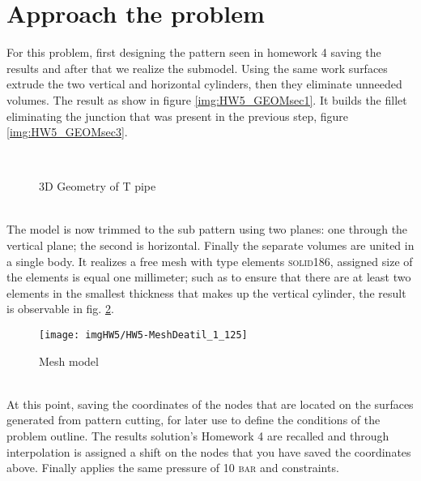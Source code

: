 \section{Approach the problem}
For this problem, first designing the pattern seen in homework 4 saving the results and after that we realize the submodel.
Using the same work surfaces extrude the two vertical and horizontal cylinders, then they eliminate unneeded volumes. The result as show in figure \ref{img:HW5_GEOMsec1}.
It builds the fillet eliminating the junction that was present in the previous step, figure \ref{img:HW5_GEOMsec3}.
\begin{figure}[!h]
\centering
{}\,
\caption{3D Geometry of T pipe}
\label{img:HW5-GeomSection}
\end{figure}\\
The model is now trimmed to the sub pattern using two planes: one through the vertical plane; the second is horizontal. Finally the separate volumes are united in a single body.
It realizes a free mesh with type elements \textsc{solid186}, assigned size of the elements is equal one millimeter; such as to ensure that there are at least two elements in the smallest thickness that makes up the vertical cylinder, the result is observable in fig. \ref{img:HW5_Mesh}.
\begin{figure}[!h]
\centering
\texttt{[image: imgHW5/HW5-MeshDeatil\_1\_125]}
\caption{Mesh model}
\label{img:HW5_Mesh}
\end{figure}\\
At this point, saving the coordinates of the nodes that are located on the surfaces generated from pattern cutting, for later use to define the conditions of the problem outline. 
The results solution's Homework 4 are recalled and through interpolation is assigned a shift on the nodes that you have saved the coordinates above. Finally applies the same pressure of 10 \textsc{bar} and constraints.
